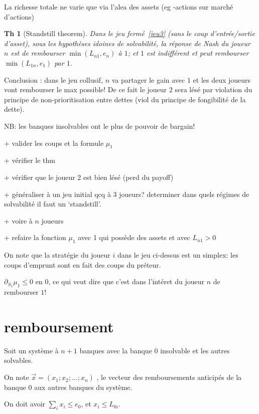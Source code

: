 \documentclass[11pt,oneside,twocolumn]{article}
\newtheorem{theorem}{Th}
\begin{document}
La richesse totale ne varie que via l'alea des assets (eg -actions sur marché d'actions)

\begin{theorem}[Standstill theorem]
Dans le jeu fermé~\ref{jeu3} (sans le coup d'entrée/sortie d'asset),
sous les hypothèses idoines de solvabilité,
la réponse de Nash du joueur $n$ est de
rembourser $\min(L_{n1},e_n)$ à $1$;
et $1$ est indifférent et peut rembourser $\min(L_{1n},e_1)$ par $1$.
\end{theorem}

Conclusion : dans le jeu collusif,
$n$ va partager le gain avec $1$ et les deux joueurs vont rembourser le max possible! De ce fait le joueur $2$ sera lésé
par violation du principe de non-prioritisation entre dettes
(viol du principe de fongibilité de la dette).

NB: les banques insolvables ont le plus de pouvoir de bargain!

+ valider les coups et la formule $\mu_1$

+ vérifier le thm

+ vérifier que le joueur 2 est bien lésé (perd du payoff)

+ généraliser à un jeu initial qcq à 3 joueurs? determiner dans quels régimes de solvabilité il faut un `standstill'.

+ voire à $n$ joueurs

+ refaire la fonction $\mu_1$ avec 1 qui possède des assets et avec $L_{n1} >0$

On note que la stratégie du joueur $i$ dans le jeu ci-dessus est un simplex:
les coups d'emprunt sont en fait des coups du préteur.

$\partial_{S_1}\mu_1\leq 0$ en $0$,
ce qui veut dire que c'est dans l'intéret du joueur $n$ de rembourser $1$!


\section{remboursement}
Soit un système à $n+1$ banques avec la banque $0$ insolvable et les autres solvables.

On note
$ \vec{x} = (x_1 ; x_2; ... ; x_n)$ , le vecteur des remboursements anticipés de la banque 0 aux autres banques du système.

On doit avoir $\sum_i x_i \leq e_0$,
et $x_i\leq L_{0i}$.
\end{document}
